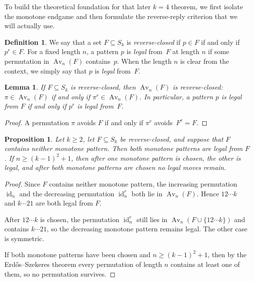 \documentclass[11pt]{amsart}
\newcommand{\Sym}{S}
\newcommand{\Av}{\operatorname{Av}}
\newcommand{\id}{\operatorname{id}}
\theoremstyle{plain}
\newtheorem{proposition}[theorem]{Proposition}
\newtheorem{lemma}[theorem]{Lemma}
\theoremstyle{definition}
\newtheorem{definition}[theorem]{Definition}
\theoremstyle{remark}
\begin{document}
To build the theoretical foundation for that later $k=4$ theorem, we first isolate the monotone
endgame and then formulate the reverse-reply criterion that we will actually use.

\begin{definition}
  We say that a set $F \subseteq \Sym_k$ is \emph{reverse-closed} if $p \in F$ if and only if
  $p^r \in F$.  For a fixed length $n$, a pattern $p$ is \emph{legal} from~$F$ at length
  $n$ if some permutation in $\Av_n(F)$ contains~$p$.  When the length $n$ is clear from the
  context, we simply say that $p$ is \emph{legal} from~$F$.
\end{definition}

\begin{lemma}\label{lem:reverse-closure-symmetry}
  If $F \subseteq \Sym_k$ is reverse-closed, then $\Av_n(F)$ is reverse-closed: $\pi \in \Av_n(F)$
  if and only if $\pi^r \in \Av_n(F)$.  In particular, a pattern $p$ is legal from $F$ if and only
  if $p^r$ is legal from~$F$.
\end{lemma}

\begin{proof}
  A permutation $\pi$ avoids $F$ if and only if $\pi^r$ avoids~$F^r = F$.
\end{proof}

\begin{proposition}\label{prop:monotone-trap}
  Let $k \geq 2$, let $F \subseteq \Sym_k$ be reverse-closed, and suppose that $F$ contains neither
  monotone pattern.  Then both monotone patterns are legal from $F$.  If
  $n \geq (k-1)^2+1$, then after one monotone pattern is chosen, the other is legal, and after both
  monotone patterns are chosen no legal moves remain.
\end{proposition}

\begin{proof}
  Since $F$ contains neither monotone pattern, the increasing permutation $\id_n$ and the decreasing
  permutation $\id_n^r$ both lie in $\Av_n(F)$.  Hence $12\cdots k$ and $k\cdots 21$ are both legal
  from $F$.

  After $12\cdots k$ is chosen, the permutation $\id_n^r$ still lies in
  $\Av_n(F \cup \{12\cdots k\})$ and contains $k\cdots 21$, so the decreasing monotone pattern
  remains legal.  The other case is symmetric.

  If both monotone patterns have been chosen and $n \geq (k-1)^2+1$, then by the Erd\H{o}s--Szekeres
  theorem every permutation of length $n$ contains at least one of them, so no permutation survives.
\end{proof}
\end{document}

